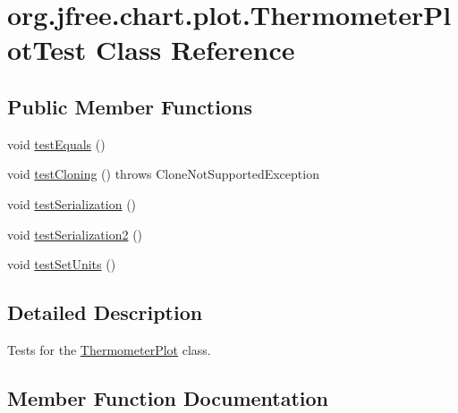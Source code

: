 \hypertarget{classorg_1_1jfree_1_1chart_1_1plot_1_1_thermometer_plot_test}{}\section{org.\+jfree.\+chart.\+plot.\+Thermometer\+Plot\+Test Class Reference}
\label{classorg_1_1jfree_1_1chart_1_1plot_1_1_thermometer_plot_test}
\subsection*{Public Member Functions}
\begin{DoxyCompactItemize}
\item 
void \mbox{\hyperlink{classorg_1_1jfree_1_1chart_1_1plot_1_1_thermometer_plot_test_a7846ff6ce64d42103a3e72a74c92c799}{test\+Equals}} ()
\item 
void \mbox{\hyperlink{classorg_1_1jfree_1_1chart_1_1plot_1_1_thermometer_plot_test_aaedc1ceef85ccd54812cc69919204cd6}{test\+Cloning}} ()  throws Clone\+Not\+Supported\+Exception 
\item 
void \mbox{\hyperlink{classorg_1_1jfree_1_1chart_1_1plot_1_1_thermometer_plot_test_ae7327fa2083594672541c82b75bbf7a2}{test\+Serialization}} ()
\item 
void \mbox{\hyperlink{classorg_1_1jfree_1_1chart_1_1plot_1_1_thermometer_plot_test_aa5bb25f82e9edd9248edec1c56b03859}{test\+Serialization2}} ()
\item 
void \mbox{\hyperlink{classorg_1_1jfree_1_1chart_1_1plot_1_1_thermometer_plot_test_af9789bd23c4c3130a3e602f5fee97c2b}{test\+Set\+Units}} ()
\end{DoxyCompactItemize}


\subsection{Detailed Description}
Tests for the \mbox{\hyperlink{classorg_1_1jfree_1_1chart_1_1plot_1_1_thermometer_plot}{Thermometer\+Plot}} class. 

\subsection{Member Function Documentation}
\mbox{\label{classorg_1_1jfree_1_1chart_1_1plot_1_1_thermometer_plot_test_aaedc1ceef85ccd54812cc69919204cd6}} 

